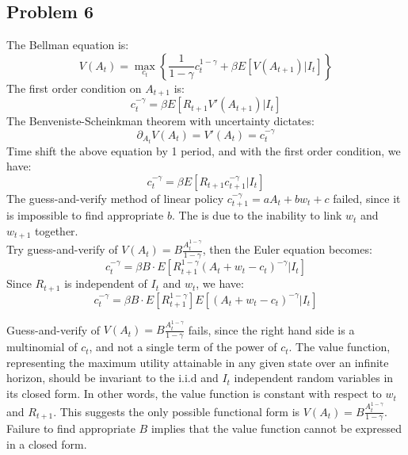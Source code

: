\documentclass{article}
\begin{document}
\subsection{Problem 6}
The Bellman equation is:
\begin{equation}
    V(A_t) = \max_{c_{t}} \left\{ \frac{1}{1-\gamma}c_t^{1-\gamma} + \beta E[V(A_{t+1}) | I_t] \right\}
\end{equation}
The first order condition on \(A_{t+1}\) is:
\begin{equation}
    c_t^{-\gamma} = \beta E\left[ R_{t+1}  V'(A_{t+1}) | I_t\right]
\end{equation}
The Benveniste-Scheinkman theorem with uncertainty dictates:
\begin{equation}
    \partial_{A_t} V(A_t) = V'(A_t) = c_t^{-\gamma}
\end{equation}
Time shift the above equation by 1 period, and with the first order condition, we have:
\begin{equation}
    c_t^{-\gamma} = \beta E\left[ R_{t+1} c_{t+1}^{-\gamma} | I_t\right]
\end{equation}
The guess-and-verify method of linear policy \(c_{t+1}^{-\gamma} = a A_t + b w_t + c\) failed, since it is impossible to find appropriate \(b\).
The is due to the inability to link \(w_t\) and \(w_{t+1}\) together. \\
Try guess-and-verify of \(V(A_t) = B \frac{A_t^{1-\gamma}}{1-\gamma} \), then the Euler equation becomes:
\begin{equation}
    c_t^{-\gamma} = \beta B \cdot E\left[ R_{t+1}^{1-\gamma} (A_t + w_t - c_t)^{-\gamma} | I_t\right]
\end{equation}
Since \(R_{t+1}\) is independent of \(I_t\) and \(w_t\), we have:
\begin{equation}
    c_t^{-\gamma} = \beta B \cdot E\left[ R_{t+1}^{1-\gamma}\right] E\left[(A_t + w_t - c_t)^{-\gamma} | I_t\right]
\end{equation}

Guess-and-verify of \(V(A_t) = B \frac{A_t^{1-\gamma}}{1-\gamma} \) fails, since the right hand side is a multinomial of \(c_t\), and not a single term of the power of \(c_t\).
The value function, representing the maximum utility attainable in any given state over an infinite horizon, should be invariant to the i.i.d and \(I_t\) independent random variables in its closed form. 
In other words, the value function is constant with respect to \(w_t\) and \(R_{t+1}\).
This suggests the only possible functional form is \(V(A_t) = B \frac{A_t^{1-\gamma}}{1-\gamma} \).
Failure to find appropriate \(B\) implies that the value function cannot be expressed in a closed form. \\
\end{document}
